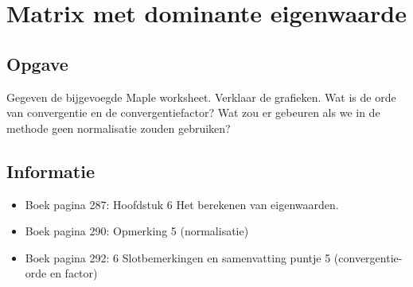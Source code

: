 \documentclass[examenvragen.tex]{subfiles}
\begin{document}
\section{Matrix met dominante eigenwaarde}
\subsection{Opgave}
Gegeven de bijgevoegde Maple worksheet. Verklaar de grafieken. Wat is de orde van convergentie en de convergentiefactor? Wat zou er gebeuren als we in de methode geen normalisatie zouden gebruiken?

\subsection{Informatie}
\begin{itemize}
\item Boek pagina 287: Hoofdstuk 6 Het berekenen van eigenwaarden.
\item Boek pagina 290: Opmerking 5 (normalisatie)
\item Boek pagina 292: 6 Slotbemerkingen en samenvatting puntje 5 (convergentie- orde en factor)
\end{itemize}
\end{document}
